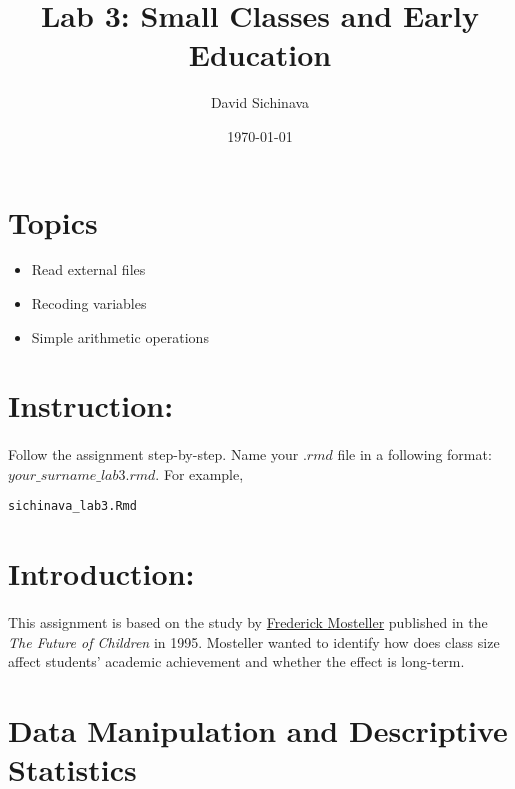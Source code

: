 \documentclass{article}\usepackage[]{graphicx}\usepackage[]{color}
\title{Lab 3: Small Classes and Early Education}
\author{David Sichinava}
\date{\today}
\makeatletter
\newcommand{\hlstd}[1]{\textcolor[rgb]{0.345,0.345,0.345}{#1}}%
\newenvironment{kframe}{%
 \def\at@end@of@kframe{}%
 \ifinner\ifhmode%
  \def\at@end@of@kframe{\end{minipage}}%
  \begin{minipage}{\columnwidth}%
 \fi\fi%
 \def\FrameCommand##1{\hskip\@totalleftmargin \hskip-\fboxsep
 \colorbox{shadecolor}{##1}\hskip-\fboxsep
     \hskip-\linewidth \hskip-\@totalleftmargin \hskip\columnwidth}%
 \MakeFramed {\advance\hsize-\width
   \@totalleftmargin\z@ \linewidth\hsize
   \@setminipage}}%
 {\par\unskip\endMakeFramed%
 \at@end@of@kframe}
\newenvironment{knitrout}{}{} %
\makeatother
\begin{document}
\maketitle
\section*{Topics}
\begin{itemize}
\item Read external files
\item Recoding variables
\item Simple arithmetic operations
\end{itemize}

\section*{Instruction:}

\paragraph{}
Follow the assignment step-by-step. Name your $.rmd$ file in a following format: $your\_surname\_lab3.rmd$. For example,

\begin{knitrout}
\color{fgcolor}\begin{kframe}
\begin{alltt}
\hlstd{sichinava_lab3.Rmd}
\end{alltt}
\end{kframe}
\end{knitrout}

\section*{Introduction:}
\paragraph{}
This assignment is based on the study by \href{https://en.wikipedia.org/wiki/Frederick_Mosteller}{Frederick Mosteller} published in the \emph{The Future of Children} in 1995. Mosteller wanted to identify how does class size affect students' academic achievement and whether the effect is long-term. 

\section*{Data Manipulation and Descriptive Statistics}
\end{document}

